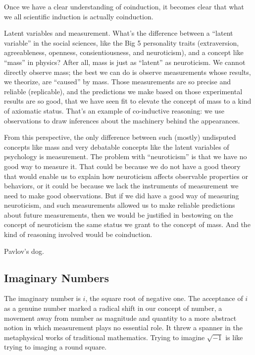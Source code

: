 \documentclass{article}
\begin{document}
Once we have a clear understanding of coinduction, it becomes clear
that what we all scientific induction is actually coinduction.

Latent variables and measurement. What's the difference between a
``latent variable'' in the social sciences, like the Big 5 personality
traits (extraversion, agreeableness, openness, consientiousness, and
neuroticism), and a concept like ``mass'' in physics? After all, mass
is just as ``latent'' as neuroticism. We cannot directly observe mass;
the best we can do is observe measurements whose results, we theorize,
are ``caused'' by mass. Those measurements are so precise and reliable
(replicable), and the predictions we make based on those experimental
results are so good, that we have seen fit to elevate the concept of
mass to a kind of axiomatic status. That's an example of co-inductive
reasoning: we use observations to draw inferences about the machinery
behind the appearances.

From this perspective, the only difference between such (mostly)
undisputed concepts like mass and very debatable concepts like the
latent variables of psychology is measurement. The problem with
``neuroticism'' is that we have no good way to measure it. That could
be because we do not have a good theory that would enable us to
explain how neuroticism affects observable properties or behaviors, or
it could be because we lack the instruments of measurement we need to
make good observations. But if we did have a good way of measuring
neuroticism, and such measurements allowed us to make reliable
predictions about future measurements, then we would be justified in
bestowing on the concept of neuroticism the same status we grant to
the concept of mass. And the kind of reasoning involved would be
coinduction.

Pavlov's dog.

\subsection{Imaginary Numbers}

The imaginary number is \(i\), the square root of negative one. The
acceptance of \(i\) as a genuine number marked a radical shift in our
concept of number, a movement away from number as magnitude and
quantity to a more abstract notion in which measurement plays no
essential role. It threw a spanner in the metaphysical works of
traditional mathematics. Trying to imagine \(\sqrt{-1}\) is like
trying to imaging a round square.
\end{document}
